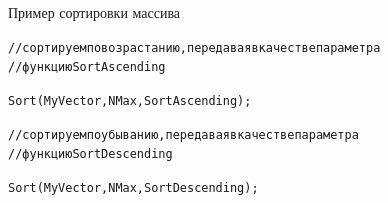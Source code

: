 \documentclass{beamer}
\begin{document}
\begin{frame}[fragile]{Пример сортировки массива}
\begin{alltt}
//сортируем по возрастанию, передавая в качестве параметра 
//функцию SortAscending

Sort(MyVector, NMax, SortAscending);

//сортируем по убыванию, передавая в качестве параметра 
//функцию SortDescending  

Sort(MyVector, NMax, SortDescending);
\end{alltt}
\end{frame}
\end{document}
